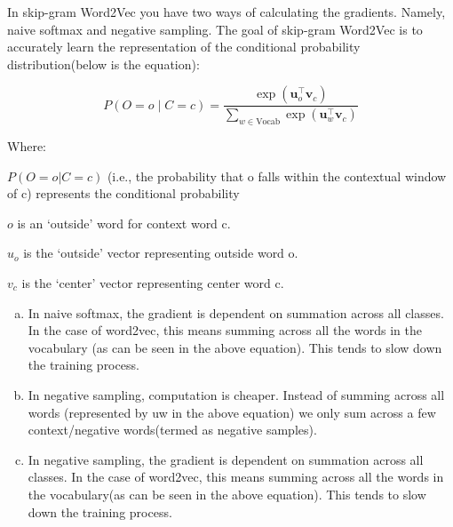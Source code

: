 \begin{enumerate}[1.]
In skip-gram Word2Vec you have two ways of calculating the gradients. Namely, naive softmax and negative sampling. The goal of skip-gram Word2Vec is to accurately learn the representation of the conditional probability distribution(below is the equation):

\begin{equation*}P(O=o \mid C=c) = \frac{\exp(\bm u_{o}^\top \bm v_c)}{\sum_{w \in \text{Vocab}} \exp(\bm u_{w}^\top \bm v_c)}\end{equation*}

Where:

$P(O = o \vert C = c)$ (i.e., the probability that o falls within the contextual window of c) represents the conditional probability

$o$ is an `outside' word for context word c.

$u_o$ is the `outside' vector representing outside word o.

$v_c$ is the `center' vector representing center word c. 

\begin{enumerate}[(a)]
\item In naive softmax, the gradient is dependent on summation across all classes. In the case of word2vec, this means summing across all the words in the vocabulary (as can be seen in the above equation). This tends to slow down the training process.
\item In negative sampling, computation is cheaper. Instead of summing across all words (represented by uw in the above equation) we only sum across a few context/negative words(termed as negative samples).
\item In negative sampling, the gradient is dependent on summation across all classes. In the case of word2vec, this means summing across all the words in the vocabulary(as can be seen in the above equation). This tends to slow down the training process.
\end{enumerate}


\end{enumerate}